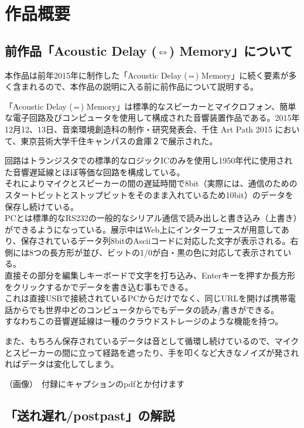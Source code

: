 \chapter{作品概要}\label{ux4f5cux54c1ux6982ux8981}

\section{前作品「Acoustic Delay (⇔)
Memory」について}\label{ux524dux4f5cux54c1acoustic-delay-memoryux306bux3064ux3044ux3066}

本作品は前年2015年に制作した「Acoustic Delay (⇔)
Memory」に続く要素が多く含まれるので、本作品の説明に入る前に前作品について説明する。

「Acoustic Delay (⇔)
Memory」は標準的なスピーカーとマイクロフォン、簡単な電子回路及びコンピュータを使用して構成された音響装置作品である。2015年12月12、13日、音楽環境創造科の制作・研究発表会、千住
Art Path 2015 において、東京芸術大学千住キャンパスの倉庫２で展示された。

回路はトランジスタでの標準的なロジックICのみを使用し1950年代に使用された音響遅延線とほぼ等価な回路を構成している。\\
それによりマイクとスピーカーの間の遅延時間で8bit（実際には、通信のためのスタートビットとストップビットをそのまま入れているため10bit）のデータを保存し続けている。\\
PCとは標準的なRS232の一般的なシリアル通信で読み出しと書き込み（上書き）ができるようになっている。展示中はWeb上にインターフェースが用意してあり、保存されているデータ列8bitのAsciiコードに対応した文字が表示される。右側には8つの長方形が並び、ビットの1/0が白・黒の色に対応して表示されている。\\
直接その部分を編集しキーボードで文字を打ち込み、Enterキーを押すか長方形をクリックするかでデータを書き込む事もできる。\\
これは直接USBで接続されているPCからだけでなく、同じURLを開けば携帯電話からでも世界中どのコンピュータからでもデータの読み/書きができる。\\
すなわちこの音響遅延線は一種のクラウドストレージのような機能を持つ。

また、もちろん保存されているデータは音として循環し続けているので、マイクとスピーカーの間に立って経路を遮ったり、手を叩くなど大きなノイズが発されればデータは変化してしまう。

（画像）　付録にキャプションのpdfとか付けます

\section{「送れ\textbar{}遅れ/post\textbar{}past」の解説}\label{ux9001ux308cux9045ux308cpostpastux306eux89e3ux8aac}

